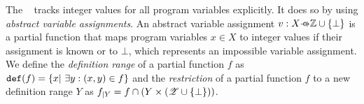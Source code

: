 \subsubsection{\ValueAnalysisCPA}
The \ \cite{Beyer2013} \cite{Beyer2015} tracks integer values for all program variables explicitly.
It does so by using \emph{abstract variable assignments}. An abstract variable assignment $v: X \partialFunc \integerset \cup \{\bot\}$ is a partial function that maps program variables $x \in X$ to integer values if their assignment is known or to $\bot$, which represents an impossible variable assignment.
We define the \emph{definition range} of a partial function $f$ as $\texttt{def}(f) = \{ x |\ \exists y : (x, y) \in f \}$ and
the \emph{restriction} of a partial function $f$ to a new definition range $Y$ as $f_{|Y} = f \cap ( Y \times (\mathscr{Z} \cup \{ \bot \}))$.

